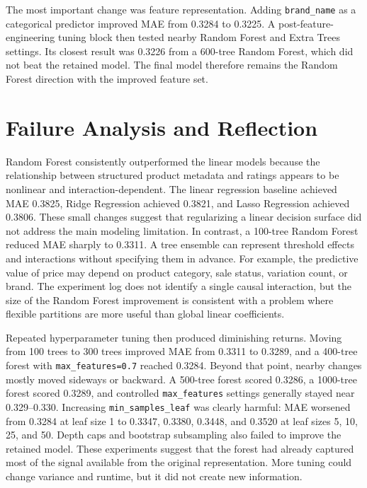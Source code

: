 The most important change was feature representation. Adding \texttt{brand\_name} as a categorical predictor improved MAE from 0.3284 to 0.3225. A post-feature-engineering tuning block then tested nearby Random Forest and Extra Trees settings. Its closest result was 0.3226 from a 600-tree Random Forest, which did not beat the retained model. The final model therefore remains the Random Forest direction with the improved feature set.

\section{Failure Analysis and Reflection}

Random Forest consistently outperformed the linear models because the relationship between structured product metadata and ratings appears to be nonlinear and interaction-dependent. The linear regression baseline achieved MAE 0.3825, Ridge Regression achieved 0.3821, and Lasso Regression achieved 0.3806. These small changes suggest that regularizing a linear decision surface did not address the main modeling limitation. In contrast, a 100-tree Random Forest reduced MAE sharply to 0.3311. A tree ensemble can represent threshold effects and interactions without specifying them in advance. For example, the predictive value of price may depend on product category, sale status, variation count, or brand. The experiment log does not identify a single causal interaction, but the size of the Random Forest improvement is consistent with a problem where flexible partitions are more useful than global linear coefficients.

Repeated hyperparameter tuning then produced diminishing returns. Moving from 100 trees to 300 trees improved MAE from 0.3311 to 0.3289, and a 400-tree forest with \texttt{max\_features=0.7} reached 0.3284. Beyond that point, nearby changes mostly moved sideways or backward. A 500-tree forest scored 0.3286, a 1000-tree forest scored 0.3289, and controlled \texttt{max\_features} settings generally stayed near 0.329--0.330. Increasing \texttt{min\_samples\_leaf} was clearly harmful: MAE worsened from 0.3284 at leaf size 1 to 0.3347, 0.3380, 0.3448, and 0.3520 at leaf sizes 5, 10, 25, and 50. Depth caps and bootstrap subsampling also failed to improve the retained model. These experiments suggest that the forest had already captured most of the signal available from the original representation. More tuning could change variance and runtime, but it did not create new information.

